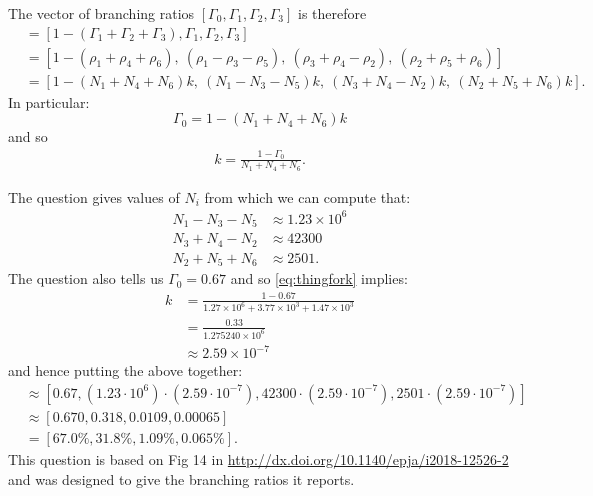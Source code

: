 \documentclass[txfonts]{NSTexam}
\newcommand\hide[1]{{}}
\begin{document}
\begin{questions}
\begin{allparts}
{\noindent[Aside: adding the four equations above and then cancelling the expression  $\sum_{i=1}^6 \rho_i$ which appears on both sides  reproduces the first equation we wrote down: $$\Gamma_0+\Gamma_1+\Gamma_2+\Gamma_3=1.$$ 
We do not need to notice this fact, but it is a sensible consistency check!]


\noindent The vector of branching ratios
$[\Gamma_0,\Gamma_1 , \Gamma_2 , \Gamma_3]$ is therefore
\begin{align}
[\Gamma_0,\ \Gamma_1,\  \Gamma_2 ,\  \Gamma_3]
&=
[1-(\Gamma_1+\Gamma_2+\Gamma_3),
\Gamma_1 , \Gamma_2 , \Gamma_3]\nonumber
\\
&=
[ 1-(\rho_1+\rho_4+\rho_6)
,\ 
(\rho_1-\rho_3-\rho_5)
,\ 
(\rho_3+\rho_4-\rho_2)
,\ 
(\rho_2+\rho_5+\rho_6)
]\nonumber
\\
&=
[ 1 -(N_1+N_4+N_6)k
,\ 
(N_1-N_3-N_5)k
,\ 
(N_3+N_4-N_2)k
,\ 
(N_2+N_5+N_6)k
]\nonumber
.
\end{align}
In particular: $$\Gamma_0=1-(N_1+N_4+N_6)k$$ and so \begin{align}k= \frac{1-\Gamma_0}{N_1+N_4+N_6}.\label{eq:thingfork}\end{align}
\hide{which means that 
\begin{align}
[\Gamma_0,\Gamma_1 , \Gamma_2 , \Gamma_3]
&=
[\Gamma_0
,
\frac{N_1-N_3-N_5}{N_1+N_4+N_6}(1-\Gamma_0)
,
\frac{N_3+N_4-N_2}{N_1+N_4+N_6}(1-\Gamma_0)
,
\frac{N_2+N_5+N_6}{N_1+N_4+N_6}(1-\Gamma_0)
].\nonumber
\end{align}
}

\noindent The question gives values of $N_i$ from which we can compute that:
\begin{align}
N_1-N_3-N_5&\approx 1.23\times10^6
\\
N_3+N_4-N_2&\approx 42300 
\\
N_2+N_5+N_6&\approx 2501.
\end{align}
The question also tells us $\Gamma_0=0.67$ and so \eqref{eq:thingfork} implies:
\begin{align}
k
&=
\frac{1-0.67}{1.27\times 10^6+3.77\times10^3+1.47\times 10^3}\nonumber
\\
&=\frac{0.33}{1.275240\times 10^6}\nonumber
\\
&\approx 2.59\times 10^{-7}\nonumber
\end{align}
and hence putting the above together:
\begin{align}
[\Gamma_0,\Gamma_1 , \Gamma_2 , \Gamma_3]
&\approx
[0.67,
( 1.23\cdot 10^6)\cdot (2.59\cdot 10^{-7}), 42300 \cdot (2.59\cdot 10^{-7}), 2501\cdot (2.59\cdot 10^{-7})
]\nonumber
\\
&\approx
[0.670,
0.318, 0.0109, 0.00065]\nonumber
\\
&=
[67.0\%, 31.8\%, 1.09\%, 0.065\%]. \nonumber
\end{align}
This question is based on Fig 14 in  \url{http://dx.doi.org/10.1140/epja/i2018-12526-2} and was designed to give the branching ratios it reports.

}
\end{allparts}
\end{questions}
\end{document}
